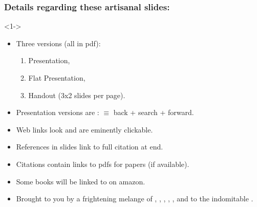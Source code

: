 \begin{frame}
  \small

  \frametitle{Details regarding these artisanal slides:}

  \begin{block}<1->{}
    \begin{itemize}
    \item<+->
      Three versions (all in pdf): 
      \begin{enumerate}
      \item 
        Presentation,
      \item
        Flat Presentation,
      \item
        Handout (3x2 slides per page).
      \end{enumerate}
    \item<+->
      Presentation versions are :\newline
      \insertbackfindforwardnavigationsymbol
      $\equiv$
      back + search + forward.
    \item<+->
      Web links look 
      and are eminently clickable.
    \item<+->
      References in slides link to full citation at end.\cite{anderson1972a}
    \item<+->
      Citations contain links to pdfs for papers (if available).
    \item<+->
      Some books will be linked to on amazon.
    \item<+->
      Brought to you by a frightening melange of 
      , 
      , 
      , 
      ,
      ,
      and 
      to the indomitable .\newline
    \end{itemize}
  \end{block}

\end{frame}

